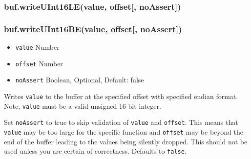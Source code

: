 \begin{Shaded}
\begin{Highlighting}[]
  \NormalTok{(}\NormalTok{);}
\NormalTok{(}\NormalTok{, }\NormalTok{);}
\NormalTok{(}\NormalTok{, }\NormalTok{);}
\NormalTok{(}\NormalTok{, }\NormalTok{);}
\NormalTok{(}\NormalTok{, }\NormalTok{);}


\end{Highlighting}
\end{Shaded}

\subsubsection{buf.writeUInt16LE(value, offset{[},
noAssert{]})}\label{buf.writeuint16levalue-offset-noassert}

\subsubsection{buf.writeUInt16BE(value, offset{[},
noAssert{]})}\label{buf.writeuint16bevalue-offset-noassert}

\begin{itemize}
\itemsep1pt\parskip0pt
\item
  \texttt{value} Number
\item
  \texttt{offset} Number
\item
  \texttt{noAssert} Boolean, Optional, Default: false
\end{itemize}

Writes \texttt{value} to the buffer at the specified offset with
specified endian format. Note, \texttt{value} must be a valid unsigned
16 bit integer.

Set \texttt{noAssert} to true to skip validation of \texttt{value} and
\texttt{offset}. This means that \texttt{value} may be too large for the
specific function and \texttt{offset} may be beyond the end of the
buffer leading to the values being silently dropped. This should not be
used unless you are certain of correctness. Defaults to \texttt{false}.

